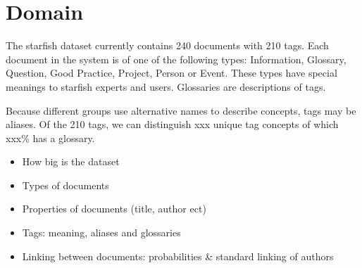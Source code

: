 

\section{Domain}
The starfish dataset currently contains 240 documents with 210 tags. Each document in the system is of one of the following types: Information, Glossary, Question, Good Practice, Project, Person or Event. These types have special meanings to starfish experts and users. Glossaries are descriptions of tags.


Because different groups use alternative names to describe concepts, tags may be aliases. Of the 210 tags, we can distinguish xxx unique tag concepts of which xxx\% has a glossary. 

\begin{itemize}
\item How big is the dataset
\item Types of documents
\item Properties of documents (title, author ect)
\item Tags: meaning, aliases and glossaries
\item Linking between documents: probabilities \& standard linking of authors
\end{itemize}
